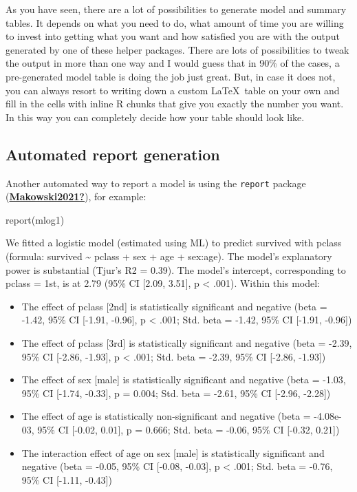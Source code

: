 \documentclass[
  11pt,
  a4paper,
  twoside]{scrbook}
\newenvironment{Shaded}{\begin{snugshade}}{\end{snugshade}}
\newcommand{\FunctionTok}[1]{\textcolor[rgb]{0.00,0.00,0.00}{#1}}
\newcommand{\NormalTok}[1]{#1}
\providecommand{\tightlist}{%
  \setlength{\itemsep}{0pt}\setlength{\parskip}{0pt}}
\begin{document}
As you have seen, there are a lot of possibilities to generate model and summary tables. It depends on what you need to do, what amount of time you are willing to invest into getting what you want and how satisfied you are with the output generated by one of these helper packages. There are lots of possibilities to tweak the output in more than one way and I would guess that in 90\% of the cases, a pre-generated model table is doing the job just great. But, in case it does not, you can always resort to writing down a custom \LaTeX~table on your own and fill in the cells with inline R chunks that give you exactly the number you want. In this way you can completely decide how your table should look like.

\hypertarget{automated-report-generation}{%
\subsection{Automated report generation}\label{automated-report-generation}}

Another automated way to report a model is using the \texttt{report} package (\protect\hyperlink{ref-Makowski2021}{\textbf{Makowski2021?}}), for example:

\linespread{1}

\begin{Shaded}
\begin{Highlighting}[]
\FunctionTok{report}\NormalTok{(mlog1)}
\end{Highlighting}
\end{Shaded}

\linespread{1}We fitted a logistic model (estimated using ML) to predict
survived with pclass (formula: survived \textasciitilde{} pclass + sex +
age + sex:age). The model's explanatory power is
substantial (Tjur's R2 = 0.39). The model's intercept,
corresponding to pclass = 1st, is at 2.79 (95\% CI {[}2.09,
3.51{]}, p \textless{} .001). Within this model:

\begin{itemize}
\tightlist
\item
  The effect of pclass {[}2nd{]} is statistically significant
  and negative (beta = -1.42, 95\% CI {[}-1.91, -0.96{]}, p \textless{}
  .001; Std. beta = -1.42, 95\% CI {[}-1.91, -0.96{]})
\item
  The effect of pclass {[}3rd{]} is statistically significant
  and negative (beta = -2.39, 95\% CI {[}-2.86, -1.93{]}, p \textless{}
  .001; Std. beta = -2.39, 95\% CI {[}-2.86, -1.93{]})
\item
  The effect of sex {[}male{]} is statistically significant and
  negative (beta = -1.03, 95\% CI {[}-1.74, -0.33{]}, p = 0.004;
  Std. beta = -2.61, 95\% CI {[}-2.96, -2.28{]})
\item
  The effect of age is statistically non-significant and
  negative (beta = -4.08e-03, 95\% CI {[}-0.02, 0.01{]}, p =
  0.666; Std. beta = -0.06, 95\% CI {[}-0.32, 0.21{]})
\item
  The interaction effect of age on sex {[}male{]} is
  statistically significant and negative (beta = -0.05, 95\%
  CI {[}-0.08, -0.03{]}, p \textless{} .001; Std. beta = -0.76, 95\% CI
  {[}-1.11, -0.43{]})
\end{itemize}
\end{document}
